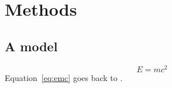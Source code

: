 \chapter{Methods}\label{ch:methods}
\section{A model}
\begin{equation}
  E = mc^2 \label{eq:emc}
\end{equation}
Equation~\eqref{eq:emc} goes back to \citet{einstein1905}.
